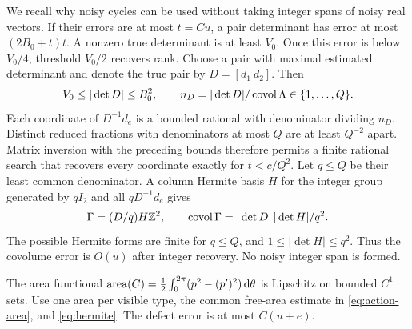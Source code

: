 We recall why noisy cycles can be used without taking integer spans of
noisy real vectors. If their errors are at most $t=C u$, a pair determinant
has error at most $(2B_0+t)t$. A nonzero true determinant is at least
$V_0$. Once this error is below $V_0/4$, threshold $V_0/2$ recovers rank.
Choose a pair with maximal estimated determinant and denote the true pair
by $D=[d_1\ d_2]$. Then
\[
 V_0\le|\det D|\le B_0^2,\qquad
 n_D=|\det D|/\operatorname{covol}\Lambda\in\{1,\ldots,Q\}.
\]
Each coordinate of $D^{-1}d_e$ is a bounded rational with denominator
dividing $n_D$. Distinct reduced fractions with denominators at most $Q$
are at least $Q^{-2}$ apart. Matrix inversion with the preceding bounds
therefore permits a finite rational search that recovers every coordinate
exactly for $t<c/Q^2$. Let $q\le Q$ be their least common denominator.
A column Hermite basis $H$ for the integer group generated by $qI_2$
and all $qD^{-1}d_e$ gives
\begin{equation}\label{eq:hermite}
 \Gamma=(D/q)H\mathbb Z^2,\qquad
 \operatorname{covol}\Gamma=|\det D|\,|\det H|/q^2.
\end{equation}
The possible Hermite forms are finite for $q\le Q$, and
$1\le|\det H|\le q^2$. Thus the covolume error is $O(u)$ after
integer recovery. No noisy integer span is formed.

The area functional
$\operatorname{area}(C)=\tfrac12\int_0^{2\pi}(p^2-(p')^2)\,\mathrm d\theta$
is Lipschitz on bounded $C^1$ sets. Use one area per visible type, the
common free-area estimate in \eqref{eq:action-area}, and
\eqref{eq:hermite}. The defect error is at most $C(u+e)$.

